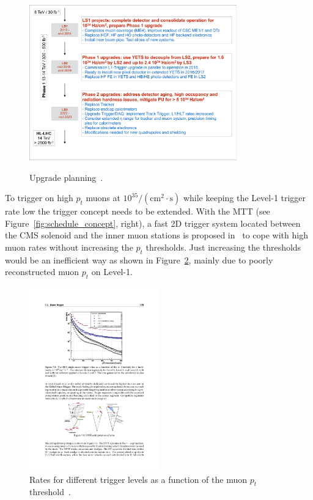 \begin{figure}[htbp]
\centering
\includegraphics[width=0.8\textwidth]{Figures/pooth/upgrade_planning.pdf}\\
\caption{Upgrade planning~\cite{upgrade_planning}.} 
\label{fig:upgrade_planning}
\end{figure}

To trigger on high $p_t$ muons at $10^{35}/(\mathrm{cm}^2 \cdot\mathrm{s})$ while keeping the Level-1 trigger rate low the trigger concept needs to be extended. With the MTT (see 
Figure~\ref{fig:schedule_concept}, right), a fast 2D trigger system located between the CMS solenoid and the inner muon stations is proposed in~\cite{mtt_concept} to cope with high 
muon rates without increasing the $p_t$ thresholds. Just increasing the thresholds would be an inefficient way as shown in Figure~\ref{fig:pt_threshold}, mainly due to poorly 
reconstructed muon $p_t$ on Level-1. 
\begin{figure}[htbp]
\centering
\includegraphics[width=0.5\textwidth]{Figures/pooth/pt_threshold.pdf}
\caption{Rates for different trigger levels as a function of the muon $p_t$ threshold~\cite{pt_threshold}.}
\label{fig:pt_threshold}
\end{figure}

